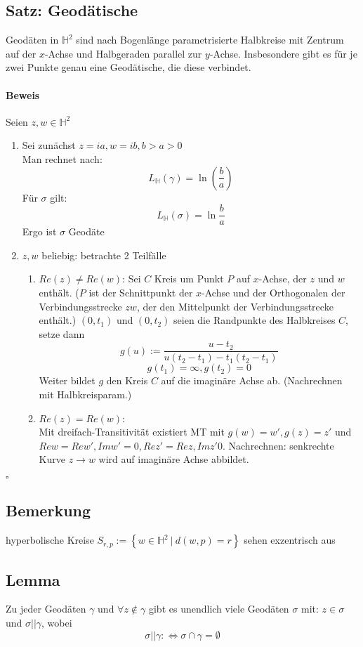 \documentclass{article}
\renewcommand{\H}{\mathbb{H}}
\newcommand{\set}[2]{\left\lbrace #1~|~#2 \right\rbrace}
\newcommand{\qed}{$\square$}
\begin{document}
\subsection{Satz: Geodätische}
Geodäten in $\H^2$ sind nach Bogenlänge parametrisierte Halbkreise mit Zentrum auf der $x$-Achse und Halbgeraden parallel zur $y$-Achse. Insbesondere gibt es für je zwei Punkte genau eine Geodätische, die diese verbindet.

\paragraph{Beweis}
Seien $z,w \in \H^2$
\begin{enumerate}
	\item Sei zunächst $z = ia, w= ib, b > a > 0$\\
	Man rechnet nach:
	\[L_\H (\gamma) = \ln(\frac{b}{a}) \]
	Für $\sigma$ gilt:
	\[L_\H (\sigma) = \ln\frac{b}{a} \]
	Ergo ist $\sigma$ Geodäte
	\item $z,w$ beliebig: betrachte 2 Teilfälle
	\begin{enumerate}
		\item $Re (z) \neq Re(w)$: Sei $C$ Kreis um Punkt $P$ auf $x$-Achse, der $z$ und $w$ enthält. ($P$ ist der Schnittpunkt der $x$-Achse und der Orthogonalen der Verbindungsstrecke $zw$, der den Mittelpunkt der Verbindungsstrecke enthält.)
		$(0, t_1)$ und $(0,t_2)$ seien die Randpunkte des Halbkreises $C$, setze dann
		\[g(u) := \frac{u - t_2}{u(t_2 - t_1)- t_1(t_2 - t_1)}\]
		\[g(t_1) = \infty, g(t_2) = 0\]
		Weiter bildet $g$ den Kreis $C$ auf die imaginäre Achse ab. (Nachrechnen mit Halbkreisparam.)
		
		\item $Re (z) = Re(w)$:\\
		Mit dreifach-Transitivität existiert MT mit $g(w) = w', g(z) = z'$ und $Re w = Re w', Im w' =0, Re z' = Re z, Im z' 0$. Nachrechnen: senkrechte Kurve $z \rightarrow w$ wird auf imaginäre Achse abbildet.
	\end{enumerate}
\end{enumerate}
\qed

\subsection{Bemerkung}
hyperbolische Kreise $S_{r,p} := \set{w\in \H^2}{d(w,p) = r}$ sehen exzentrisch aus

\subsection{Lemma}
Zu jeder Geodäten $\gamma$ und $\forall z \notin \gamma$ gibt es unendlich viele Geodäten $\sigma$ mit: $z \in \sigma $ und $\sigma || \gamma$, wobei 
\[\sigma || \gamma : \Leftrightarrow \sigma \cap \gamma = \emptyset \]
\end{document}
